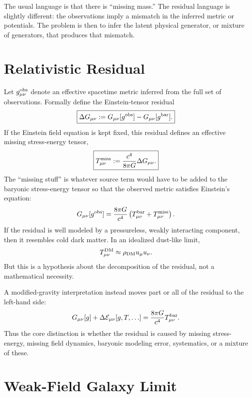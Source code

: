 \documentclass[10pt]{article}
\newcommand{\cG}{\frac{8\pi G}{c^4}}
\newcommand{\Tmiss}{T^{\rm miss}_{\mu\nu}}
\newcommand{\Gobs}{G_{\mu\nu}[g^{\rm obs}]}
\newcommand{\Gbar}{G_{\mu\nu}[g^{\rm bar}]}
\begin{document}
The usual language is that there is ``missing mass.'' The residual language is slightly different: the observations imply a mismatch in the inferred metric or potentials. The problem is then to infer the latent physical generator, or mixture of generators, that produces that mismatch.

\section{Relativistic Residual}

Let $g^{\rm obs}_{\mu\nu}$ denote an effective spacetime metric inferred from the full set of observations. Formally define the Einstein-tensor residual
\begin{equation}
\boxed{
\Delta G_{\mu\nu}
:=
\Gobs-\Gbar .
}
\end{equation}
If the Einstein field equation is kept fixed, this residual defines an effective missing stress-energy tensor,
\begin{equation}
\boxed{
\Tmiss
:=
\frac{c^4}{8\pi G}\Delta G_{\mu\nu}.
}
\end{equation}
The ``missing stuff'' is whatever source term would have to be added to the baryonic stress-energy tensor so that the observed metric satisfies Einstein's equation:
\begin{equation}
G_{\mu\nu}[g^{\rm obs}]
=
\cG\left(T^{\rm bar}_{\mu\nu}+\Tmiss\right).
\end{equation}
If the residual is well modeled by a pressureless, weakly interacting component, then it resembles cold dark matter. In an idealized dust-like limit,
\begin{equation}
T^{\rm DM}_{\mu\nu}\approx \rho_{\rm DM}u_\mu u_\nu.
\end{equation}
But this is a hypothesis about the decomposition of the residual, not a mathematical necessity.

A modified-gravity interpretation instead moves part or all of the residual to the left-hand side:
\begin{equation}
G_{\mu\nu}[g]+\Delta{\cal E}_{\mu\nu}[g,T,\ldots]
=
\cG T^{\rm bar}_{\mu\nu}.
\end{equation}
Thus the core distinction is whether the residual is caused by missing stress-energy, missing field dynamics, baryonic modeling error, systematics, or a mixture of these.

\section{Weak-Field Galaxy Limit}
\end{document}
